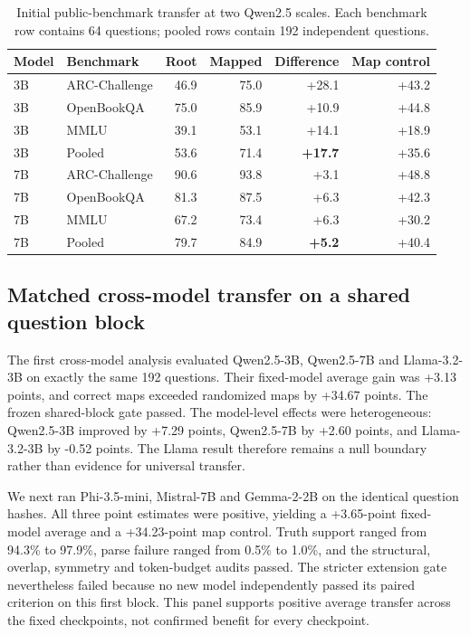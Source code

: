\documentclass[11pt]{article}
\begin{document}
\begin{table}[H]
\centering\small
\caption{Initial public-benchmark transfer at two Qwen2.5 scales. Each benchmark row contains 64 questions; pooled rows contain 192 independent questions.}
\label{tab:public}
\begin{tabular}{llrrrr}
\toprule
Model & Benchmark & Root & Mapped & Difference & Map control \\
\midrule
3B & ARC-Challenge & 46.9 & 75.0 & +28.1 & +43.2 \\
3B & OpenBookQA & 75.0 & 85.9 & +10.9 & +44.8 \\
3B & MMLU & 39.1 & 53.1 & +14.1 & +18.9 \\
3B & Pooled & 53.6 & 71.4 & \textbf{+17.7} & +35.6 \\
\midrule
7B & ARC-Challenge & 90.6 & 93.8 & +3.1 & +48.8 \\
7B & OpenBookQA & 81.3 & 87.5 & +6.3 & +42.3 \\
7B & MMLU & 67.2 & 73.4 & +6.3 & +30.2 \\
7B & Pooled & 79.7 & 84.9 & \textbf{+5.2} & +40.4 \\
\bottomrule
\end{tabular}
\end{table}

\subsection{Matched cross-model transfer on a shared question block}

The first cross-model analysis evaluated Qwen2.5-3B, Qwen2.5-7B and Llama-3.2-3B on exactly the same 192 questions. Their fixed-model average gain was +3.13 points, and correct maps exceeded randomized maps by +34.67 points. The frozen shared-block gate passed. The model-level effects were heterogeneous: Qwen2.5-3B improved by +7.29 points, Qwen2.5-7B by +2.60 points, and Llama-3.2-3B by -0.52 points. The Llama result therefore remains a null boundary rather than evidence for universal transfer.

We next ran Phi-3.5-mini, Mistral-7B and Gemma-2-2B on the identical question hashes. All three point estimates were positive, yielding a +3.65-point fixed-model average and a +34.23-point map control. Truth support ranged from 94.3\% to 97.9\%, parse failure ranged from 0.5\% to 1.0\%, and the structural, overlap, symmetry and token-budget audits passed. The stricter extension gate nevertheless failed because no new model independently passed its paired criterion on this first block. This panel supports positive average transfer across the fixed checkpoints, not confirmed benefit for every checkpoint.
\end{document}
